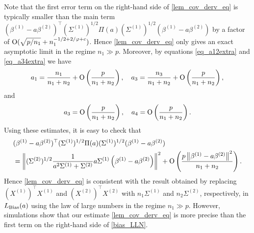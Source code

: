 Note that the first error term on the right-hand side of \eqref{lem_cov_derv_eq} is typically smaller than the main term $ (\beta^{(1)}- a\beta^{(2)} )^\top (\Sigma^{(1)})^{1/2} \Pi(a)(\Sigma^{(1)})^{1/2} (\beta^{(1)}- a\beta^{(2)})  $ by a factor of $\operatorname{O}(\sqrt{p/n_1} + n_1^{-1/2+2/\varphi + c})$. Hence \eqref{lem_cov_derv_eq} only gives an exact asymptotic limit in the regime $n_1\gg p$. Moreover, by equations \eqref{eq_a12extra} and \eqref{eq_a34extra} we have
$$a_1 =\frac{n_1}{n_1+n_2} + \operatorname{O}\left( \frac{p}{n_1+n_2}\right), \quad a_3 =\frac{n_3}{n_1+n_2} + \operatorname{O}\left( \frac{p}{n_1+n_2}\right),$$
and
$$a_3 =\operatorname{O}\left( \frac{p}{n_1+n_2}\right),\quad a_4 =\operatorname{O}\left( \frac{p}{n_1+n_2}\right).$$
Using these estimates, it is easy to check that
\begin{align}
& (\beta^{(1)}- a\beta^{(2)} )^\top (\Sigma^{(1)})^{1/2} \Pi(a)(\Sigma^{(1)})^{1/2} (\beta^{(1)}- a\beta^{(2)})   \nonumber \\
&=\left\| (\Sigma^{(2)})^{1/2}\frac{1}{a^2\Sigma^{(1)}+\Sigma^{(2)}} a \Sigma^{(1)} \left(\beta^{(1)}- a\beta^{(2)}\right) \right\|^2 + \OO\left( \frac{p\left\|\beta^{(1)}- a\beta^{(2)}\right\|^2}{n_1+n_2}  \right)  . \label{bias_LLN}
\end{align}
Hence \eqref{lem_cov_derv_eq} is consistent with the result obtained by replacing $ (X^{(1)})^\top X^{(1)}$ and $ (X^{(2)})^\top X^{(2)}$ with $n_1\Sigma^{(1)}$ and $n_2\Sigma^{(2)}$, respectively, in $L_{\textup{Bias}} (a) $ using the law of large numbers in the regime $n_1\gg p$. However, simulations show that our estimate \eqref{lem_cov_derv_eq} is more precise than the first term on the right-hand side of \eqref{bias_LLN}.

